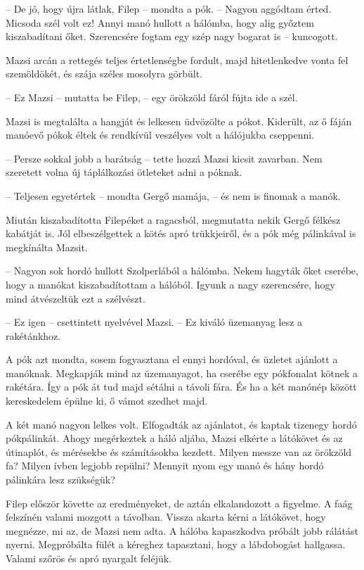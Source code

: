\documentclass[10pt]{memoir}
\begin{document}
-- De jó, hogy újra látlak, Filep -- mondta a pók. -- Nagyon aggódtam érted.
Micsoda szél volt ez! Annyi manó hullott a hálómba, hogy alig győztem
kiszabadítani őket. Szerencsére fogtam egy szép nagy bogarat is -- kuncogott.

Mazsi arcán a rettegés teljes értetlenségbe fordult, majd hitetlenkedve vonta
fel szemöldökét, és szája széles mosolyra görbült.

-- Ez Mazsi -- mutatta be Filep, -- egy örökzöld fáról fújta ide a szél.

Mazsi is megtalálta a hangját és lelkesen üdvözölte a pókot. Kiderült, az ő
fáján manóevő pókok éltek és rendkívül veszélyes volt a hálójukba cseppenni.

-- Persze sokkal jobb a barátság -- tette hozzá Mazsi kicsit zavarban. Nem
szeretett volna új táplálkozási ötleteket adni a póknak.

-- Teljesen egyetértek -- mondta Gergő mamája, -- és nem is finomak a manók.

Miután kiszabadította Filepéket a ragacsból, megmutatta nekik Gergő félkész
kabátját is. Jól elbeszélgettek a kötés apró trükkjeiről, és a pók még
pálinkával is megkínálta Mazsit.

-- Nagyon sok hordó hullott Szolperlából a hálómba. Nekem hagyták őket
cserébe, hogy a manókat kiszabadítottam a hálóból. Igyunk a nagy szerencsére,
hogy mind átvészeltük ezt a szélvészt.

-- Ez igen -- csettintett nyelvével Mazsi. -- Ez kiváló üzemanyag lesz a
rakétánkhoz.

A pók azt mondta, sosem fogyasztana el ennyi hordóval, és üzletet ajánlott a
manóknak. Megkapják mind az üzemanyagot, ha cserébe egy pókfonalat kötnek a
rakétára. Így a pók át tud majd sétálni a távoli fára. És ha a két manónép
között kereskedelem épülne ki, ő vámot szedhet majd.

A két manó nagyon lelkes volt. Elfogadták az ajánlatot, és kaptak tizenegy
hordó pókpálinkát. Ahogy megérkeztek a háló aljába, Mazsi elkérte a látókövet
és az útinaplót, és mérésekbe és számításokba kezdett. Milyen messze van az
örökzöld fa? Milyen ívben legjobb repülni? Mennyit nyom egy manó és hány hordó
pálinkára lesz szükségük?

Filep először követte az eredményeket, de aztán elkalandozott a figyelme. A
faág felszínén valami mozgott a távolban. Vissza akarta kérni a látókövet, hogy
megnézze, mi az, de Mazsi nem adta. A hálóba kapaszkodva próbált jobb rálátást
nyerni. Megpróbálta fülét a kéreghez tapasztani, hogy a lábdobogást hallgassa.
Valami szőrös és apró nyargalt feléjük.
\end{document}
